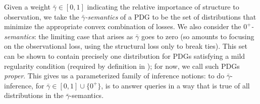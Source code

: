 \documentclass{article}
\newcommand\zogamma{{\bar\gamma}}
\begin{document}
%
Given a weight $\zogamma
\in [0,1]
$
indicating the relative importance of structure to observation,
we take the \emph{$\zogamma$-semantics} of a PDG to be the
set of distributions that minimize 
the appropriate convex combination of losses.
We also consider the \emph{$0^+$-semantics}: the limiting case that
arises as $\zogamma$ goes to zero
(so amounts to focusing on the observational loss, using the structural loss only to break ties).
This set
can be shown to contain precisely one distribution
for PDGs satisfying a mild regularity condition 
(required by definition in \citeauthor{pdg-aaai});
for now, we call such PDGs \emph{proper}.
This gives us a parameterized family of inference notions:
to do $\zogamma$-inference, for $\zogamma \in [0,1] \cup \{0^+\}$,
is to answer queries in a way that is true of all distributions in the $\zogamma$-semantics.
\end{document}
